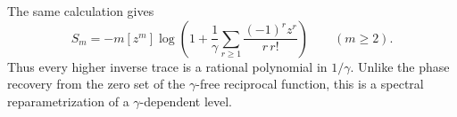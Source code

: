 \begin{remark}
The same calculation gives
\[
 S_m=-m[z^m]\log\left(
  1+\frac1\gamma\sum_{r\ge1}
       \frac{(-1)^r z^r}{r\,r!}\right)
 \qquad(m\ge2).
\]
Thus every higher inverse trace is a rational polynomial in \(1/\gamma\).
Unlike the phase recovery from the zero set of the \(\gamma\)-free
reciprocal function, this is a spectral reparametrization of a
\(\gamma\)-dependent level.
\end{remark}

